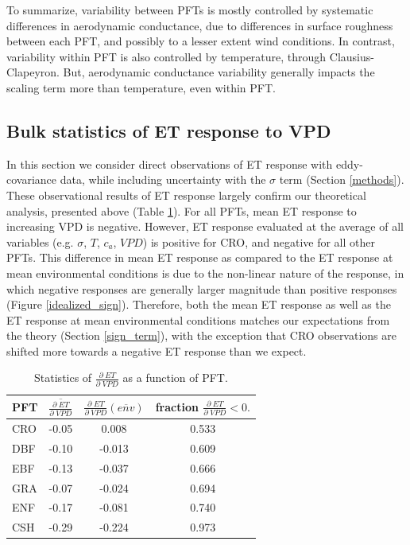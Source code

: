 \documentclass[draft,linenumbers]{agujournal}
\begin{document}
To summarize, variability between PFTs is mostly controlled by
systematic differences in aerodynamic conductance, due to differences
in surface roughness between each PFT, and possibly to a lesser extent
wind conditions. In contrast, variability within PFT is also
controlled by temperature, through Clausius-Clapeyron. But,
aerodynamic conductance variability generally impacts the scaling term
more than temperature, even within PFT.

\subsection{Bulk statistics of ET response to VPD}
\label{stats_sec}

In this section we consider direct observations of ET response with
eddy-covariance data, while including uncertainty with the $\sigma$
term (Section \ref{methods}). These observational results of ET
response largely confirm our theoretical analysis, presented above
(Table \ref{stats}). For all PFTs, mean ET response to increasing VPD
is negative. However, ET response evaluated at the average of all
variables (e.g. $\sigma$, $T$, $c_a$, $VPD$) is positive for CRO, and
negative for all other PFTs. This difference in mean ET response as
compared to the ET response at mean environmental conditions is due to
the non-linear nature of the response, in which negative responses are
generally larger magnitude than positive responses (Figure
\ref{idealized_sign}). Therefore, both the mean ET response as well as
the ET response at mean environmental conditions matches our
expectations from the theory (Section \ref{sign_term}), with the
exception that CRO observations are shifted more towards a negative ET
response than we expect.

\begin{table}
\caption{Statistics of $\frac{\partial \; ET}{\partial \; VPD}$ as a
function of PFT.}  \centering
\begin{tabular}{l c c c} \hline PFT & $\overline{\frac{\partial \;
ET}{\partial \; VPD}}$ & $\frac{\partial \; ET}{\partial \;
VPD}\left(\overline{env}\right)$ & fraction $\frac{\partial \;
ET}{\partial \; VPD} < 0.$ \\ \hline CRO & -0.05 & 0.008 & 0.533 \\
DBF & -0.10 & -0.013 & 0.609 \\ EBF & -0.13 & -0.037 & 0.666 \\ GRA &
-0.07 & -0.024 & 0.694 \\ ENF & -0.17 & -0.081 & 0.740 \\ CSH & -0.29
& -0.224 & 0.973 \\ \hline
\end{tabular}
  \label{stats}
\end{table}
\end{document}
